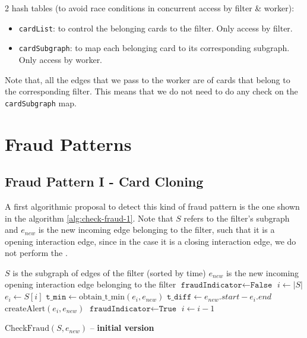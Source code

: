 \documentclass{article}
\begin{document}
2 hash tables (to avoid race conditions in concurrent access by filter & worker):
\begin{itemize}
  \item \texttt{cardList}: to control the belonging cards to the filter. Only access by filter.
  \item \texttt{cardSubgraph}: to map each belonging card to its corresponding subgraph. Only access by worker.
\end{itemize}

Note that, all the edges that we pass to the worker are of cards that belong to the corresponding filter. This means that we do not need to do any check on the \texttt{cardSubgraph} map.

\section{Fraud Patterns}

\subsection{Fraud Pattern I - Card Cloning}

A first algorithmic proposal to detect this kind of fraud pattern is the one shown in the algorithm
\ref{alg:check-fraud-1}. Note that $S$ refers to the filter's subgraph and $e_{new}$ is the new incoming edge belonging to the filter, such that it is a opening interaction edge, since in the case it is a closing interaction edge, we do not perform the .

\begin{algorithm}[H]
    \small
    \begin{algorithmic}[1]
    \REQUIRE $S$ is the subgraph of edges of the filter (sorted by time)
    \REQUIRE $e_{new}$ is the new incoming opening interaction edge belonging to the filter 
    \STATE $\texttt{fraudIndicator} \gets \texttt{False}$
    \STATE $i \gets |S|$
      \STATE $e_i \gets S[i]$
      \STATE $\texttt{t\_min} \gets \text{obtain\_t\_min}(e_i, e_{new})$
      \STATE $\texttt{t\_diff} \gets e_{new}.start - e_i.end$
        \STATE $\text{createAlert}(e_i, e_{new})$
        \STATE $\texttt{fraudIndicator} \gets \texttt{True}$
      \ENDIF
      \STATE $i \gets i - 1$
    \ENDWHILE
    \end{algorithmic}
    \caption{$\text{CheckFraud}(S, e_{new})$ -- \textbf{initial version}}
    \label{alg:check-fraud-1}
\end{algorithm}
\end{document}
